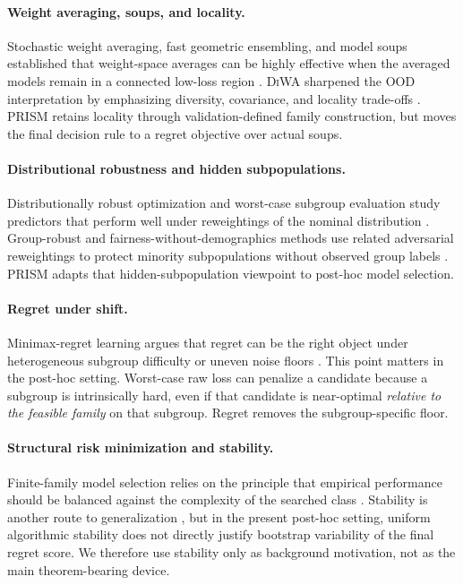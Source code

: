 \documentclass{article}
\newcommand{\prism}{\textup{\textsc{PRISM}}}
\newcommand{\diwa}{\textup{\textsc{DiWA}}}
\newcommand{\ood}{OOD}
\newcommand{\1}{\mathbbm{1}}
\begin{document}
\paragraph{Weight averaging, soups, and locality.}
Stochastic weight averaging, fast geometric ensembling, and model soups established that weight-space averages can be highly effective when the averaged models remain in a connected low-loss region \citep{izmailov2018swa,garipov2018fge,frankle2020linear,wortsman2022soups}. \diwa{} sharpened the \ood{} interpretation by emphasizing diversity, covariance, and locality trade-offs \citep{rame2022diwa}. \prism{} retains locality through validation-defined family construction, but moves the final decision rule to a regret objective over actual soups.

\paragraph{Distributional robustness and hidden subpopulations.}
Distributionally robust optimization and worst-case subgroup evaluation study predictors that perform well under reweightings of the nominal distribution \citep{duchi2016fdiv,duchi2021learning,li2021worstcase}. Group-robust and fairness-without-demographics methods use related adversarial reweightings to protect minority subpopulations without observed group labels \citep{hashimoto2018fairness,lahoti2020fairness}. \prism{} adapts that hidden-subpopulation viewpoint to post-hoc model selection.

\paragraph{Regret under shift.}
Minimax-regret learning argues that regret can be the right object under heterogeneous subgroup difficulty or uneven noise floors \citep{agarwal2022mro}. This point matters in the post-hoc setting. Worst-case raw loss can penalize a candidate because a subgroup is intrinsically hard, even if that candidate is near-optimal \emph{relative to the feasible family} on that subgroup. Regret removes the subgroup-specific floor.

\paragraph{Structural risk minimization and stability.}
Finite-family model selection relies on the principle that empirical performance should be balanced against the complexity of the searched class \citep{bartlett2002rademacher}. Stability is another route to generalization \citep{bousquet2002stability}, but in the present post-hoc setting, uniform algorithmic stability does not directly justify bootstrap variability of the final regret score. We therefore use stability only as background motivation, not as the main theorem-bearing device.
\end{document}
